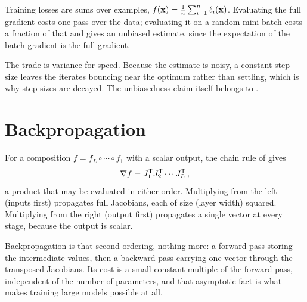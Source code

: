 Training losses are sums over examples,
\(f(\mathbf{x})=\frac1n\sum_{i=1}^{n}\ell_i(\mathbf{x})\). Evaluating the full
gradient costs one pass over the data; evaluating it on a random mini-batch
costs a fraction of that and gives an unbiased estimate, since the expectation of
the batch gradient is the full gradient.

\begin{remark}
The trade is variance for speed. Because the estimate is noisy, a constant step
size leaves the iterates bouncing near the optimum rather than settling, which is
why step sizes are decayed. The unbiasedness claim itself belongs to
.
\end{remark}

\section{Backpropagation}

For a composition \(f=f_L\circ\cdots\circ f_1\) with a scalar output, the chain
rule of  gives
\[
	\nabla f=J_1^{\mathsf{T}} J_2^{\mathsf{T}}\cdots J_L^{\mathsf{T}}\,,
\]
a product that may be evaluated in either order. Multiplying from the left
(inputs first) propagates full Jacobians, each of size (layer width) squared.
Multiplying from the right (output first) propagates a single vector at every
stage, because the output is scalar.

Backpropagation is that second ordering, nothing more: a forward pass storing
the intermediate values, then a backward pass carrying one vector through the
transposed Jacobians. Its cost is a small constant multiple of the forward pass,
independent of the number of parameters, and that asymptotic fact is what makes
training large models possible at all.

